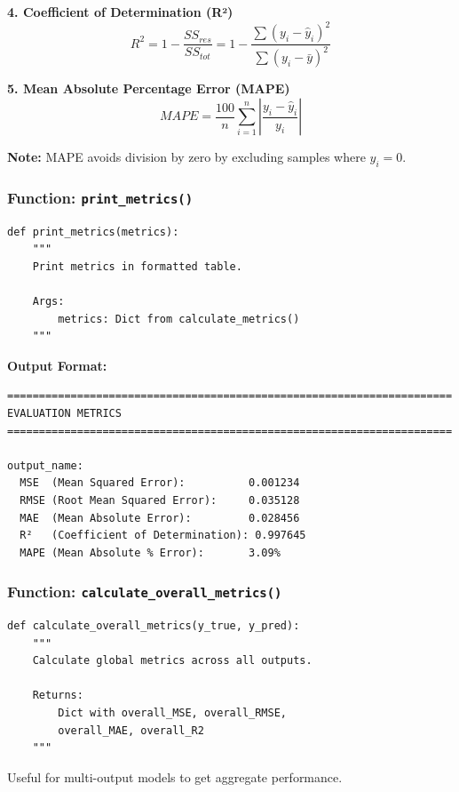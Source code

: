 \documentclass[11pt,a4paper]{article}
\begin{document}
\textbf{4. Coefficient of Determination (R²)}
\begin{equation}
R^2 = 1 - \frac{SS_{res}}{SS_{tot}} = 1 - \frac{\sum(y_i - \hat{y}_i)^2}{\sum(y_i - \bar{y})^2}
\end{equation}

\textbf{5. Mean Absolute Percentage Error (MAPE)}
\begin{equation}
MAPE = \frac{100}{n}\sum_{i=1}^{n}\left|\frac{y_i - \hat{y}_i}{y_i}\right|
\end{equation}

\textbf{Note:} MAPE avoids division by zero by excluding samples where $y_i = 0$.

\subsubsection{Function: \texttt{print\_metrics()}}

\begin{lstlisting}
def print_metrics(metrics):
    """
    Print metrics in formatted table.

    Args:
        metrics: Dict from calculate_metrics()
    """
\end{lstlisting}

\textbf{Output Format:}
\begin{verbatim}
======================================================================
EVALUATION METRICS
======================================================================

output_name:
  MSE  (Mean Squared Error):          0.001234
  RMSE (Root Mean Squared Error):     0.035128
  MAE  (Mean Absolute Error):         0.028456
  R²   (Coefficient of Determination): 0.997645
  MAPE (Mean Absolute % Error):       3.09%
\end{verbatim}

\subsubsection{Function: \texttt{calculate\_overall\_metrics()}}

\begin{lstlisting}
def calculate_overall_metrics(y_true, y_pred):
    """
    Calculate global metrics across all outputs.

    Returns:
        Dict with overall_MSE, overall_RMSE,
        overall_MAE, overall_R2
    """
\end{lstlisting}

Useful for multi-output models to get aggregate performance.
\end{document}
